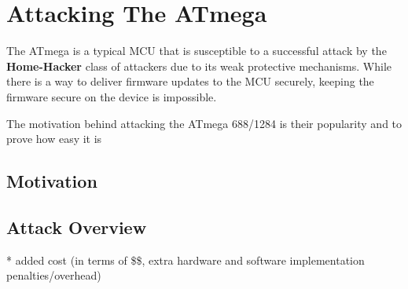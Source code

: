 \section{Attacking The ATmega}
\label{sec:attacking_mega}

The ATmega is a typical MCU that is susceptible to a successful attack by the \textbf{Home-Hacker} class of attackers due to its weak protective mechanisms. While there is a way to deliver firmware updates to the MCU securely\citep{tech:aes_bls}, keeping the firmware secure on the device is impossible.

The motivation behind attacking the ATmega 688/1284 is their popularity and to prove how easy it is

	\subsection{Motivation}
	
	\subsection{Attack Overview}
		* added cost (in terms of \$\$, extra hardware and software implementation penalties/overhead)